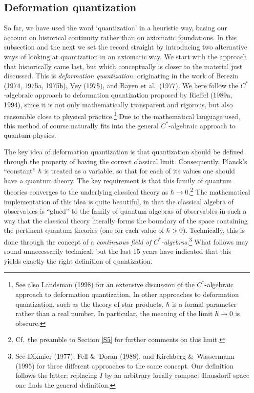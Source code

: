 \documentclass[12pt]{article}
\newcommand{\ca}{$C^*$-algebra} \newcommand{\jba}{JB-algebra}
\newcommand{\raw}{\rightarrow} \newcommand{\rat}{\mapsto}
\begin{document}
 \subsection{Deformation quantization}\label{DQsection}
 So far, we have used the word `quantization' in a heuristic way, basing our account on historical continuity rather than on axiomatic foundations. In this subsection and the next we set the record straight by introducing two alternative ways of looking at quantization in an axiomatic way. We start with the approach that historically came last, but which conceptually is closer to the material just discussed. This is {\it deformation quantization}, originating in the work of Berezin (1974, 1975a, 1975b), Vey (1975),  and  Bayen et al.\ (1977). We here follow the \ca ic approach to deformation quantization proposed by Rieffel (1989a, 1994), since it is not only mathematically transparent and rigorous, but also reasonable close to physical practice.\footnote{See also Landsman (1998) for an extensive discussion of the  \ca ic approach to deformation quantization. In other approaches  to deformation quantization, such as the theory of star products, $\hbar$ is a formal parameter rather than a real number. In particular, the meaning of the limit $\hbar\raw 0$ is obscure.} Due to the mathematical language used, this method of course naturally fits into the general  $C^*$-algebraic approach to quantum physics.
 
The key idea of  deformation quantization is that quantization should be defined through the property of having the correct classical limit. Consequently, Planck's ``constant'' $\hbar$ is treated as a variable, so that for each of its values one should have a quantum theory. The key requirement is that this family of quantum theories converges to the underlying classical theory as $\hbar\raw 0$.\footnote{Cf.\ the preamble to Section \ref{S5} for further comments on this limit.}  The mathematical implementation of this idea is quite beautiful, in that the classical algebra of observables is ``glued'' to the family of quantum  algebras of observables in such a way that the classical theory  literally forms the boundary of the space containing the pertinent quantum theories (one for each value of $\hbar>0$). Technically, this is done through the concept of a {\it continuous field of
 \ca s}.\footnote{See Dixmier (1977), Fell \&\ Doran (1988), and Kirchberg \&\  Wassermann (1995) for three different approaches to the same concept. Our definition follows the latter;
replacing $I$ by an arbitrary locally compact Hausdorff space one finds the general definition.}  What follows may sound unnecessarily technical, but the last 15 years have indicated that this yields exactly the right definition of quantization.
\end{document}
